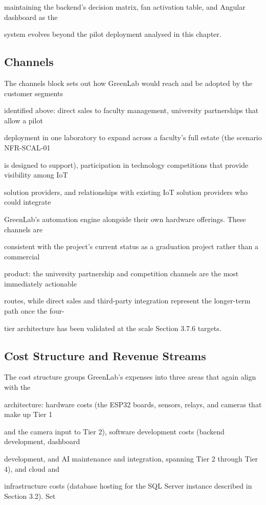 maintaining the backend's decision matrix, fan activation table, and Angular dashboard as the

system evolves beyond the pilot deployment analysed in this chapter.


\subsection{Channels}
The channels block sets out how GreenLab would reach and be adopted by the customer segments

identified above: direct sales to faculty management, university partnerships that allow a pilot

deployment in one laboratory to expand across a faculty's full estate (the scenario NFR-SCAL-01

is designed to support), participation in technology competitions that provide visibility among IoT

solution providers, and relationships with existing IoT solution providers who could integrate

GreenLab's automation engine alongside their own hardware offerings. These channels are

consistent with the project's current status as a graduation project rather than a commercial

product: the university partnership and competition channels are the most immediately actionable

routes, while direct sales and third-party integration represent the longer-term path once the four-

tier architecture has been validated at the scale Section 3.7.6 targets.


\subsection{Cost Structure and Revenue Streams}
The cost structure groups GreenLab's expenses into three areas that again align with the

architecture: hardware costs (the ESP32 boards, sensors, relays, and cameras that make up Tier 1

and the camera input to Tier 2), software development costs (backend development, dashboard

development, and AI maintenance and integration, spanning Tier 2 through Tier 4), and cloud and

infrastructure costs (database hosting for the SQL Server instance described in Section 3.2). Set


